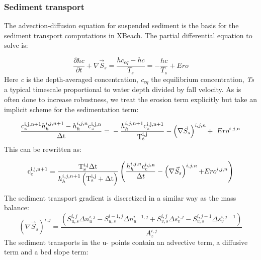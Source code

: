 \documentclass{article}
\begin{document}
\subsubsection{ Sediment transport}

\noindent The advection-diffusion equation for suspended sediment is the basis for the sediment transport computations in XBeach. The partial differential equation to solve is:

\noindent 
\begin{equation} \label{6.12)} 
\frac{\partial hc}{\partial t} +\nabla \vec{S}_{s} =\frac{hc_{eq} -hc}{T_{s} } =-\frac{hc}{T_{s} } +Ero 
\end{equation} 
Here \textit{c }is the depth-averaged concentration, \textit{c${}_{eq}$} the equilibrium concentration, \textit{Ts} a typical timescale proportional to water depth divided by fall velocity. As is often done to increase robustness, we treat the erosion term explicitly but take an implicit scheme for the sedimentation term:

\noindent 
\begin{equation} \label{6.13)} 
\frac{{\rm c}_{{\rm z}}^{{\rm i,j,n+1}} h_{h}^{i,j,n+1} -h_{h}^{i,j,n} {\rm c}_{z}^{{\rm i,j,n}} }{\Delta {\rm t}} {\rm \; =\; }-\frac{h_{h}^{i,j,n+1} {\rm c}_{z}^{{\rm i,j,n+1}} }{{\rm T}_{{\rm s}}^{{\rm i,j}} } -\left(\nabla \vec{S}_{s} \right)^{i,j,n} {\rm +\; \; }Ero^{i,j,n}  
\end{equation} 
This can be rewritten as:

 
\begin{equation} \label{6.14)} 
{\rm c}_{{\rm c}}^{{\rm i,j,n+1}} {\rm \; =\; }\frac{{\rm T}_{{\rm s}}^{{\rm i,j}} \Delta {\rm t}}{h_{h}^{i,j,n+1} \left({\rm T}_{{\rm s}}^{{\rm i,j}} +\Delta {\rm t}\right)} \left(\frac{h_{h}^{i,j,n} {\rm c}_{{\rm c}}^{{\rm i,j,n}} }{\Delta t} -\left(\nabla \vec{S}_{s} \right)^{i,j,n} {\rm +}Ero^{i,j,n} \right) 
\end{equation} 


\noindent The sediment transport gradient is discretized in a similar way as the mass balance:
\begin{equation} \label{6.15)} 
\left(\nabla \vec{S}_{s} \right)^{i,j} =\frac{\left(S_{u,s}^{i,j} \Delta n_{u}^{i,j} -S_{u,s}^{i-1,j} \Delta n_{u}^{i-1,j} +S_{v,s}^{i,j} \Delta s_{v}^{i,j} -S_{v,s}^{i,j-1} \Delta s_{v}^{i,j-1} \right)}{A_{z}^{i,j} }  
\end{equation} 
The sediment transports in the u- points contain an advective term, a diffusive term and a bed slope term:
\end{document}
